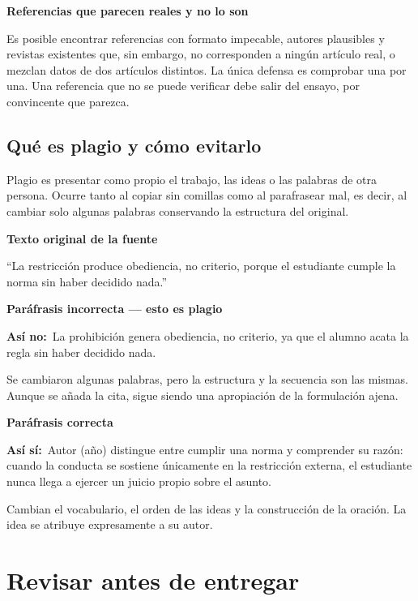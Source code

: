 \documentclass[12pt,a4paper,openany]{report}
\newenvironment{ejemplo}[1]
	{\begin{lrbox}{\cajaguardada}\begin{minipage}{\dimexpr\textwidth-2\fboxsep\relax}\vspace{4pt}\textcolor{verdeejemplo}{\textbf{\sffamily\small #1}}\par\vspace{3pt}\small}
	{\vspace{4pt}\end{minipage}\end{lrbox}\par\vspace{4pt}\noindent\colorbox{cremaejemplo}{\usebox{\cajaguardada}}\par\vspace{8pt}}
\newenvironment{aviso}[1]
	{\begin{lrbox}{\cajaguardada}\begin{minipage}{\dimexpr\textwidth-2\fboxsep\relax}\vspace{4pt}\textbf{\sffamily\small #1}\par\vspace{3pt}\small}
	{\vspace{4pt}\end{minipage}\end{lrbox}\par\vspace{4pt}\noindent\colorbox{grisclaro}{\usebox{\cajaguardada}}\par\vspace{8pt}}
\newcommand{\mal}{\textcolor{rojoerror}{\textbf{\sffamily\small As\'i no:}}\ }
\newcommand{\bien}{\textcolor{verdeejemplo}{\textbf{\sffamily\small As\'i s\'i:}}\ }
\begin{document}
\begin{aviso}{Referencias que parecen reales y no lo son}
Es posible encontrar referencias con formato impecable, autores plausibles y revistas existentes que, sin embargo, no corresponden a ning\'un art\'iculo real, o mezclan datos de dos art\'iculos distintos. La \'unica defensa es comprobar una por una. Una referencia que no se puede verificar debe salir del ensayo, por convincente que parezca.
\end{aviso}

\section{Qu\'e es plagio y c\'omo evitarlo}

Plagio es presentar como propio el trabajo, las ideas o las palabras de otra persona. Ocurre tanto al copiar sin comillas como al parafrasear mal, es decir, al cambiar solo algunas palabras conservando la estructura del original.

\begin{ejemplo}{Texto original de la fuente}
``La restricci\'on produce obediencia, no criterio, porque el estudiante cumple la norma sin haber decidido nada.''
\end{ejemplo}

\begin{ejemplo}{Par\'afrasis incorrecta --- esto es plagio}
\mal La prohibici\'on genera obediencia, no criterio, ya que el alumno acata la regla sin haber decidido nada.

Se cambiaron algunas palabras, pero la estructura y la secuencia son las mismas. Aunque se a\~nada la cita, sigue siendo una apropiaci\'on de la formulaci\'on ajena.
\end{ejemplo}

\begin{ejemplo}{Par\'afrasis correcta}
\bien Autor (a\~no) distingue entre cumplir una norma y comprender su raz\'on: cuando la conducta se sostiene \'unicamente en la restricci\'on externa, el estudiante nunca llega a ejercer un juicio propio sobre el asunto.

Cambian el vocabulario, el orden de las ideas y la construcci\'on de la oraci\'on. La idea se atribuye expresamente a su autor.
\end{ejemplo}

\chapter{Revisar antes de entregar}
\end{document}
